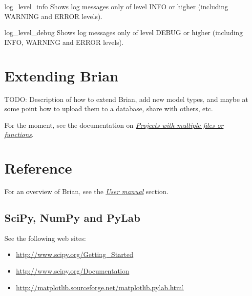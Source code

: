 \documentclass[letterpaper,10pt,english]{manual}
\begin{document}
\hypertarget{brian.log_level_info}{}\begin{funcdesc}{log\_level\_info}{}
Shows log messages only of level INFO or higher (including WARNING and ERROR levels).
\end{funcdesc}

\hypertarget{brian.log_level_debug}{}\begin{funcdesc}{log\_level\_debug}{}
Shows log messages only of level DEBUG or higher (including INFO, WARNING and ERROR levels).
\end{funcdesc}

\resetcurrentobjects
\hypertarget{--doc-extending}{}

\chapter{Extending Brian}

TODO: Description of how to extend Brian, add new model types, and maybe at
some point how to upload them to a database, share with others, etc.

For the moment, see the documentation on \hyperlink{projects-with-multiple-files}{\emph{Projects with multiple files or functions}}.

\resetcurrentobjects
\hypertarget{--doc-reference}{}

\chapter{Reference}

For an overview of Brian, see the \hyperlink{user-manual}{\emph{User manual}} section.

\resetcurrentobjects
\hypertarget{--doc-reference-scipy}{}

\section{SciPy, NumPy and PyLab}
See the following web sites:
\begin{itemize}
\item {} 
\href{http://www.scipy.org/Getting\_Started}{http://www.scipy.org/Getting\_Started}

\item {} 
\href{http://www.scipy.org/Documentation}{http://www.scipy.org/Documentation}

\item {} 
\href{http://matplotlib.sourceforge.net/matplotlib.pylab.html}{http://matplotlib.sourceforge.net/matplotlib.pylab.html}

\end{itemize}
\end{document}

